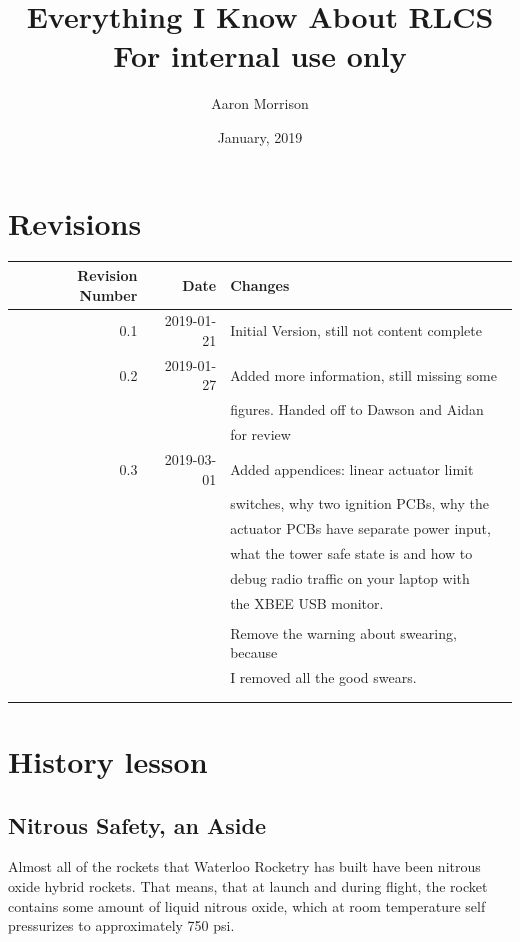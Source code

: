 \documentclass[11pt]{article}
\author{Aaron Morrison}
\date{January, 2019}
\title{Everything I Know About RLCS\\\medskip
\large For internal use only}
\begin{document}
\maketitle
\tableofcontents


\section{Revisions}
\label{sec:org307fd79}
\begin{center}
\begin{tabular}{rrl}
Revision Number & Date & Changes\\
\hline
0.1 & 2019-01-21 & Initial Version, still not content complete\\
\hline
0.2 & 2019-01-27 & Added more information, still missing some\\
 &  & figures. Handed off to Dawson and Aidan\\
 &  & for review\\
\hline
0.3 & 2019-03-01 & Added appendices: linear actuator limit\\
 &  & switches, why two ignition PCBs, why the\\
 &  & actuator PCBs have separate power input,\\
 &  & what the tower safe state is and how to\\
 &  & debug radio traffic on your laptop with\\
 &  & the XBEE USB monitor.\\
 &  & \\
 &  & Remove the warning about swearing, because\\
 &  & I removed all the good swears.\\
 &  & \\
 &  & \\
\end{tabular}
\end{center}


\section{History lesson}
\label{sec:orge610adf}

\subsection{Nitrous Safety, an Aside}
\label{sec:org236cc74}
Almost all of the rockets that Waterloo Rocketry has built have been nitrous
oxide hybrid rockets. That means, that at launch and during flight, the rocket
contains some amount of liquid nitrous oxide, which at room temperature self
pressurizes to approximately 750 psi.
\end{document}
